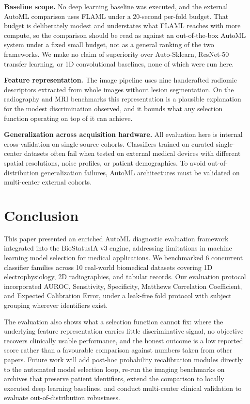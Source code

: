 \documentclass[conference]{IEEEtran}
\begin{document}
\textbf{Baseline scope.} No deep learning baseline was executed, and the external AutoML comparison uses FLAML under a 20-second per-fold budget. That budget is deliberately modest and understates what FLAML reaches with more compute, so the comparison should be read as against an out-of-the-box AutoML system under a fixed small budget, not as a general ranking of the two frameworks. We make no claim of superiority over Auto-Sklearn, ResNet-50 transfer learning, or 1D convolutional baselines, none of which were run here.

\textbf{Feature representation.} The image pipeline uses nine handcrafted radiomic descriptors extracted from whole images without lesion segmentation. On the radiography and MRI benchmarks this representation is a plausible explanation for the modest discrimination observed, and it bounds what any selection function operating on top of it can achieve.

\textbf{Generalization across acquisition hardware.} All evaluation here is internal cross-validation on single-source cohorts. Classifiers trained on curated single-center datasets often fail when tested on external medical devices with different spatial resolutions, noise profiles, or patient demographics. To avoid out-of-distribution generalization failures, AutoML architectures must be validated on multi-center external cohorts.

\section{Conclusion}
This paper presented an enriched AutoML diagnostic evaluation framework integrated into the BioStatusIA v3 engine, addressing limitations in machine learning model selection for medical applications. We benchmarked 6 concurrent classifier families across 10 real-world biomedical datasets covering 1D electrophysiology, 2D radiographies, and tabular records. Our evaluation protocol incorporated AUROC, Sensitivity, Specificity, Matthews Correlation Coefficient, and Expected Calibration Error, under a leak-free fold protocol with subject grouping wherever identifiers exist.


The evaluation also shows what a selection function cannot fix: where the underlying feature representation carries little discriminative signal, no objective recovers clinically usable performance, and the honest outcome is a low reported score rather than a favourable comparison against numbers taken from other papers. Future work will add post-hoc probability recalibration modules directly to the automated model selection loop, re-run the imaging benchmarks on archives that preserve patient identifiers, extend the comparison to locally executed deep learning baselines, and conduct multi-center clinical validation to evaluate out-of-distribution robustness.
\end{document}
